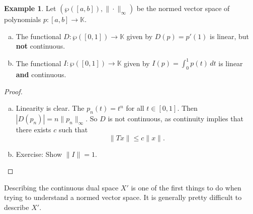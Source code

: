 \documentclass[10pt, oneside, reqno]{amsart}
\theoremstyle{plain}%
\theoremstyle{definition}
\newtheorem{exmp}[thm]{Example}
\theoremstyle{remark}
\newcommand{\K}{\mathbb{K}}
\begin{document}
\begin{exmp}
	Let $(\wp([a,b]), \| \cdot \|_\infty)$ be the normed vector space of polynomials $p: [a,b] \rightarrow \K$. 				
	\begin{enumerate}[(a)]
		\item The functional $D : \wp([0,1]) \rightarrow \K$ given by $D(p) = p'(1)$ is linear, but \textbf{not} continuous.
		\item The functional $I: \wp([0,1]) \rightarrow \K$ given by $I(p) = \int_0^1 p(t) \, dt$ is linear \textbf{and} continuous.
	\end{enumerate}
\end{exmp}

\begin{proof}
\begin{enumerate}[(a)]
		\item Linearity is clear.  The $p_n(t) = t^n$ for all $t \in [0,1]$.  Then $|D(p_n)| =   n \| p_n \|_\infty$.  So $D$ is not continuous, as continuity implies that there exists $c$ such that \[
			\| Tx \| \leq c \| x \|.
		\]
		\item Exercise: Show $\| I \| = 1$.
\end{enumerate}
\end{proof}

Describing the continuous dual space $X'$ is one of the first things to do when trying to understand a normed vector space.  It is generally pretty difficult to describe $X'$.
\end{document}
